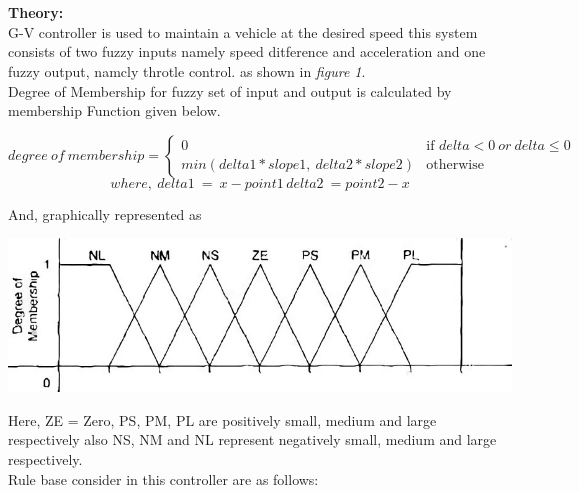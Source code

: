 \documentclass[a4paper, 12pt, fleqn]{article}
\begin{document}
\newpage
\section*{}

\textbf{Theory:} \\

\noindent
G-V controller is used to maintain a vehicle at the desired speed this system consists of two fuzzy inputs namely speed ditference and acceleration and one fuzzy output, namcly throtle control. as shown in \emph{figure 1}.\\

\noindent
Degree of Membership for fuzzy set of input and output is calculated by membership Function given below.

\[
degree\ of\ membership= 
\begin{cases}
0										& \text{if }  delta < 0\ or\ delta \leq 0 \\
min(delta1*slope1,\ delta2*slope 2)	& \text{otherwise}
\end{cases}
\]
\[
where,\ delta1\ =\ x-point1\, delta2\ =point2-x
\]

And, graphically represented as
\begin{center}
	\vspace{0.1cm}
	\includegraphics[scale=1.75]{membership_function}
\end{center}

Here, ZE = Zero, PS, PM, PL are positively small, medium and large respectively also NS, NM and NL
represent negatively small, medium and large respectively. \\

\noindent
Rule base consider in this controller are as follows: \\
\end{document}
